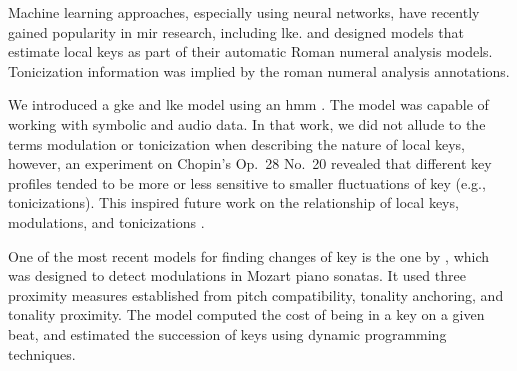 Machine learning approaches, especially using neural
networks, have recently gained popularity in \gls{mir}
research, including \gls{lke}. \textcite{chen2018functional,
chen2019harmony} and \textcite{micchi2020not} designed
models that estimate local keys as part of their automatic
Roman numeral analysis models. Tonicization information was
implied by the roman numeral analysis annotations.

We introduced a \gls{gke} and \gls{lke} model using an
\gls{hmm} \textcite{napoleslopez2019keyfinding}. The model
was capable of working with symbolic and audio data. In that
work, we did not allude to the terms modulation or
tonicization when describing the nature of local keys,
however, an experiment on Chopin's Op.~28 No.~20 revealed
that different key profiles tended to be more or less
sensitive to smaller fluctuations of key (e.g.,
tonicizations). This inspired future work on the
relationship of local keys, modulations, and tonicizations
\parencite{napoleslopez2020local}.

One of the most recent models for finding changes of key is
the one by \textcite{feisthauer2020estimating}, which was
designed to detect modulations in Mozart piano sonatas. It
used three proximity measures established from pitch
compatibility, tonality anchoring, and tonality proximity.
The model computed the cost of being in a key on a given
beat, and estimated the succession of keys using dynamic
programming techniques.
